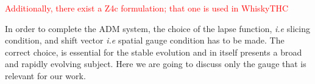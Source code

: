 \documentclass[11pt,a4paper,headinclude=true,DIV=14,BCOR=8mm,chapterprefix,listof=totoc,twoside,openright,abstracton]{scrbook}
\newcommand{\red}[1]{\textcolor{red}{#1}}
\begin{document}



\red{Additionally, there exist a Z4c formulation; that one is used in WhiskyTHC}


In order to complete the ADM system, the choice of the lapse function, \textit{i.e} slicing condition, and shift vector \textit{i.e} spatial gauge condition has to be made. The correct choice, is essential for the stable evolution and in itself presents a broad and rapidly evolving subject. Here we are going to discuss only the gauge that is relevant for our work. 
\end{document}
